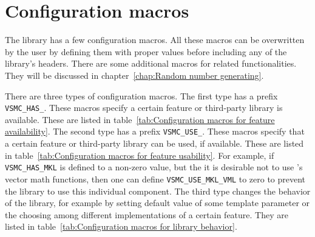 \chapter{Configuration macros}
\label{chap:Configuration macros}

The library has a few configuration macros. All these macros can be overwritten
by the user by defining them with proper values before including any of the
library's headers. There are some additional macros for \rng related
functionalities. They will be discussed in chapter~\ref{chap:Random number
  generating}.

There are three types of configuration macros. The first type has a prefix
\verb|VSMC_HAS_|. These macros specify a certain feature or third-party library
is available. These are listed in table~\ref{tab:Configuration macros for
  feature availability}. The second type has a prefix \verb|VSMC_USE_|. These
macros specify that a certain feature or third-party library can be used, if
available. These are listed in table~\ref{tab:Configuration macros for feature
  usability}. For example, if \verb|VSMC_HAS_MKL| is defined to a non-zero
value, but the it is desirable not to use \mkl's vector math functions, then
one can define \verb|VSMC_USE_MKL_VML| to zero to prevent the library to use
this individual component. The third type changes the behavior of the library,
for example by setting default value of some template parameter or the choosing
among different implementations of a certain feature. They are listed in
table~\ref{tab:Configuration macros for library behavior}.


